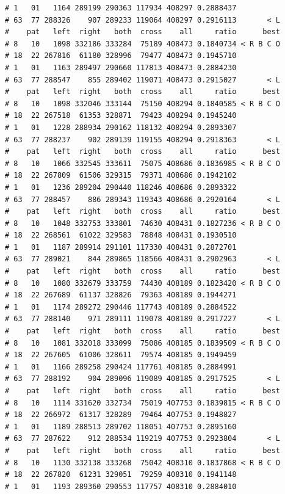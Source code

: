 \documentclass{article}\usepackage[]{graphicx}\usepackage[]{color}
\makeatletter
\newenvironment{kframe}{%
 \def\at@end@of@kframe{}%
 \ifinner\ifhmode%
  \def\at@end@of@kframe{\end{minipage}}%
  \begin{minipage}{\columnwidth}%
 \fi\fi%
 \def\FrameCommand##1{\hskip\@totalleftmargin \hskip-\fboxsep
 \colorbox{shadecolor}{##1}\hskip-\fboxsep
     \hskip-\linewidth \hskip-\@totalleftmargin \hskip\columnwidth}%
 \MakeFramed {\advance\hsize-\width
   \@totalleftmargin\z@ \linewidth\hsize
   \@setminipage}}%
 {\par\unskip\endMakeFramed%
 \at@end@of@kframe}
\newenvironment{knitrout}{}{} %
\makeatother
\begin{document}
\begin{knitrout}
\begin{kframe}
\begin{verbatim}
# 1   01   1164 289199 290363 117934 408297 0.2888437          
# 63  77 288326    907 289233 119064 408297 0.2916113       < L
#    pat   left  right   both  cross    all     ratio      best
# 8   10   1098 332186 333284  75189 408473 0.1840734 < R B C O
# 18  22 267816  61180 328996  79477 408473 0.1945710          
# 1   01   1163 289497 290660 117813 408473 0.2884230          
# 63  77 288547    855 289402 119071 408473 0.2915027       < L
#    pat   left  right   both  cross    all     ratio      best
# 8   10   1098 332046 333144  75150 408294 0.1840585 < R B C O
# 18  22 267518  61353 328871  79423 408294 0.1945240          
# 1   01   1228 288934 290162 118132 408294 0.2893307          
# 63  77 288237    902 289139 119155 408294 0.2918363       < L
#    pat   left  right   both  cross    all     ratio      best
# 8   10   1066 332545 333611  75075 408686 0.1836985 < R B C O
# 18  22 267809  61506 329315  79371 408686 0.1942102          
# 1   01   1236 289204 290440 118246 408686 0.2893322          
# 63  77 288457    886 289343 119343 408686 0.2920164       < L
#    pat   left  right   both  cross    all     ratio      best
# 8   10   1048 332753 333801  74630 408431 0.1827236 < R B C O
# 18  22 268561  61022 329583  78848 408431 0.1930510          
# 1   01   1187 289914 291101 117330 408431 0.2872701          
# 63  77 289021    844 289865 118566 408431 0.2902963       < L
#    pat   left  right   both  cross    all     ratio      best
# 8   10   1080 332679 333759  74430 408189 0.1823420 < R B C O
# 18  22 267689  61137 328826  79363 408189 0.1944271          
# 1   01   1174 289272 290446 117743 408189 0.2884522          
# 63  77 288140    971 289111 119078 408189 0.2917227       < L
#    pat   left  right   both  cross    all     ratio      best
# 8   10   1081 332018 333099  75086 408185 0.1839509 < R B C O
# 18  22 267605  61006 328611  79574 408185 0.1949459          
# 1   01   1166 289258 290424 117761 408185 0.2884991          
# 63  77 288192    904 289096 119089 408185 0.2917525       < L
#    pat   left  right   both  cross    all     ratio      best
# 8   10   1114 331620 332734  75019 407753 0.1839815 < R B C O
# 18  22 266972  61317 328289  79464 407753 0.1948827          
# 1   01   1189 288513 289702 118051 407753 0.2895160          
# 63  77 287622    912 288534 119219 407753 0.2923804       < L
#    pat   left  right   both  cross    all     ratio      best
# 8   10   1130 332138 333268  75042 408310 0.1837868 < R B C O
# 18  22 267820  61231 329051  79259 408310 0.1941148          
# 1   01   1193 289360 290553 117757 408310 0.2884010          

\end{verbatim}
\end{kframe}
\end{knitrout}
\end{document}
